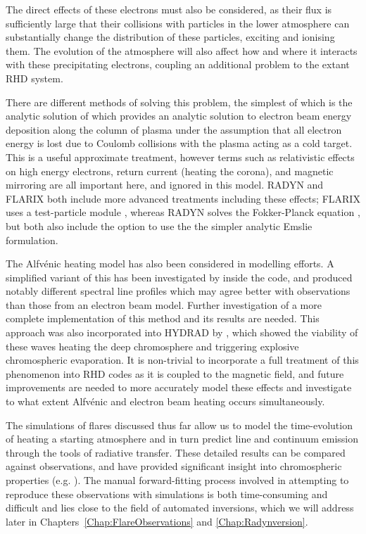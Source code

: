The direct effects of these electrons must also be considered, as their flux is sufficiently large that their collisions with particles in the lower atmosphere can substantially change the distribution of these particles, exciting and ionising them.
The evolution of the atmosphere will also affect how and where it interacts with these precipitating electrons, coupling an additional problem to the extant RHD system.

There are different methods of solving this problem, the simplest of which is the analytic solution of \citet{Emslie1978} which provides an analytic solution to electron beam energy deposition along the column of plasma under the assumption that all electron energy is lost due to Coulomb collisions with the plasma acting as a cold target.
This is a useful approximate treatment, however terms such as relativistic effects on high energy electrons, return current (heating the corona), and magnetic mirroring are all important here, and ignored in this model. RADYN and FLARIX both include more advanced treatments including these effects; FLARIX uses a test-particle module \citep{Varady2010}, whereas RADYN solves the Fokker-Planck equation \citep[now using the method of ][]{Allred2020}, but both also include the option to use the the simpler analytic Emslie formulation.

The Alfvénic heating model has also been considered in modelling efforts.
A simplified variant of this has been investigated by \citet{Kerr2016} inside the \Radyn{} code, and produced notably different spectral line profiles which may agree better with observations than those from an electron beam model.
Further investigation of a more complete implementation of this method and its results are needed.
This approach was also incorporated into HYDRAD by \citet{Reep2016}, which showed the viability of these waves heating the deep chromosphere and triggering explosive chromospheric evaporation.
It is non-trivial to incorporate a full treatment of this phenomenon into RHD codes as it is coupled to the magnetic field, and future improvements are needed to more accurately model these effects and investigate to what extent Alfvénic and electron beam heating occurs simultaneously.

The simulations of flares discussed thus far allow us to model the time-evolution of heating a starting atmosphere and in turn predict line and continuum emission through the tools of radiative transfer.
These detailed results can be compared against observations, and have provided significant insight into chromospheric properties (e.g. \citet{Kuridze2015,RubioDaCosta2016,Kowalski2017,Simoes2017}).
The manual forward-fitting process involved in attempting to reproduce these observations with simulations is both time-consuming and difficult and lies close to the field of automated inversions, which we will address later in Chapters~\ref{Chap:FlareObservations} and \ref{Chap:Radynversion}.


